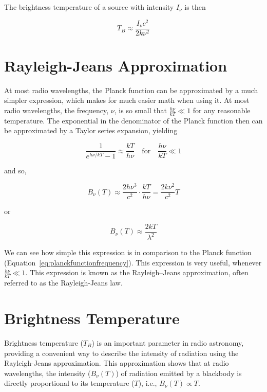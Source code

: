 
The brightness temperature of a source with intensity \(I_\nu\) is then

\[
T_B \approx \frac{I_\nu c^2}{2k\nu^2}
\]

\section{Rayleigh-Jeans Approximation}

At most radio wavelengths, the Planck function can be approximated by a much simpler expression, which makes for much easier math when using it. At most radio wavelengths, the frequency, $\nu$, is so small that $\frac{h \nu}{k T} \ll 1$ for any reasonable temperature. The exponential in the denominator of the Planck function then can be approximated by a Taylor series expansion, yielding

\begin{equation}
\frac{1}{e^{h\nu/kT} - 1} \approx \frac{kT}{h\nu} \quad \text{for} \quad \frac{h\nu}{kT} \ll 1
\label{eq:taylor}
\end{equation}

and so,

\begin{equation}
B_\nu (T) \approx \frac{2h\nu^3}{c^2} \cdot \frac{kT}{h\nu} = \frac{2k\nu^2}{c^2} T
\label{eq:rayleigh_jeans_freq}
\end{equation}

or

\begin{equation}
B_\nu (T) \approx \frac{2kT}{\lambda^2}
\label{eq:rayleigh_jeans_wave}
\end{equation}

We can see how simple this expression is in comparison to the Planck function (Equation~\eqref{eq:planckfunctionfrequency}). This expression is very useful, whenever $\frac{h \nu}{k T} \ll 1$. This expression is known as the Rayleigh--Jeans approximation, often referred to as the Rayleigh-Jeans law.

\section{Brightness Temperature}

Brightness temperature (\( T_B \)) is an important parameter in radio astronomy, providing a convenient way to describe the intensity of radiation using the Rayleigh-Jeans approximation. This approximation shows that at radio wavelengths, the intensity (\( B_\nu(T) \)) of radiation emitted by a blackbody is directly proportional to its temperature (\( T \)), i.e., \( B_\nu(T) \propto T \). \\

